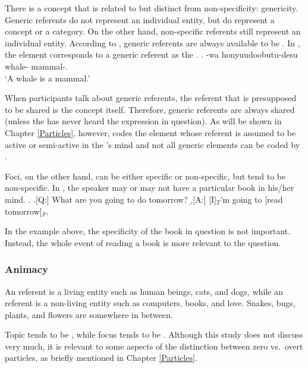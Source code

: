 There is a concept that is related to but distinct from non-specificity: genericity.
Generic referents do not represent an individual entity,
but do represent a concept or a category.
On the other hand, non-specific referents still represent an individual entity.
According to ,
generic referents are always available to be .
In \Next,
the element  corresponds to a generic referent as the .
%
\exg. -wa honyuudoobutu-desu \\
		whale- mammal-. \\
		`A whale is a mammal.' \hfill{\cite[][p.\ 270]{kuno72}}

When participants talk about generic referents,
the referent that is presupposed to be shared is the concept itself.
Therefore, generic referents are always shared
(unless the  has never heard the expression in question).
As will be shown in Chapter \ref{Particles}, however,
 codes the element whose referent is assumed to be active or semi-active  in the 's mind and
not all generic elements can be coded by .


Foci, on the other hand, can be either specific or non-specific,
but tend to be non-specific.
In \Next[A],
the speaker may or may not have a particular book in his/her mind.
%
\ex. \a.[Q:] What are you going to do tomorrow?
	\b.[A:] [I]$_{T}$'m going to [read  tomorrow]$_{F}$.

In the example above,
the specificity of the book in question is not important.
Instead, the whole event of reading a book is more relevant to the question.



\subsubsection{Animacy}

An  referent is a living entity such as human beings, cats, and dogs,
while an  referent is a non-living entity such as computers, books, and love.
Snakes, bugs, plants, and flowers are somewhere in between.

Topic tends to be ,
while focus tends to be  \cite{givon76,keenan76,comrie79,comrie83,dubois87}.
Although this study does not discuss  very much,
it is relevant to some aspects of the distinction between
zero vs.\ overt particles,
as briefly mentioned in Chapter \ref{Particles}.


